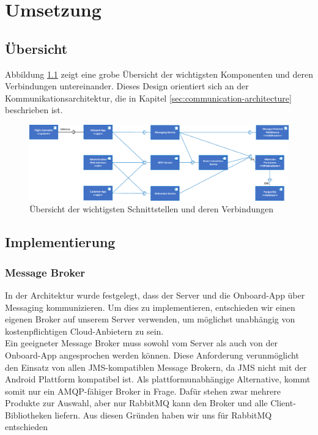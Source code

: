\newpage
\chapter{Umsetzung}

\section{Übersicht}

Abbildung \ref{fig:component-overview} zeigt eine grobe Übersicht der wichtigsten Komponenten und deren Verbindungen untereinander. Dieses Design orientiert sich an der Kommunikationsarchitektur, die in Kapitel \ref{sec:communication-architecture} beschrieben ist.

\begin{figure}[H]
	\includegraphics[width=1.0\textwidth]{images/component-overview.pdf}
	\caption{Übersicht der wichtigsten Schnittstellen und deren Verbindungen }
	\label{fig:component-overview}
\end{figure}
\section{Implementierung}

\subsection{Message Broker}
In der Architektur wurde festgelegt, dass der Server und die Onboard-App über Messaging kommunizieren. Um dies zu implementieren, entschieden wir einen eigenen Broker auf unserem Server verwenden, um möglichst unabhängig von kostenpflichtigen Cloud-Anbietern zu sein. \\

Ein geeigneter Message Broker muss sowohl vom Server als auch von der Onboard-App angesprochen werden können. Diese Anforderung verunmöglicht den Einsatz von allen \Gls{JMS}-kompatiblen Message Brokern, da \Gls{JMS} nicht mit der Android Plattform kompatibel ist. Als plattformunabhängige Alternative, kommt somit nur ein \Gls{AMQP}-fähiger Broker in Frage. Dafür stehen zwar mehrere Produkte zur Auswahl, aber nur RabbitMQ kann den Broker und alle Client-Bibliotheken liefern. Aus diesen Gründen haben wir uns für RabbitMQ entschieden\\

